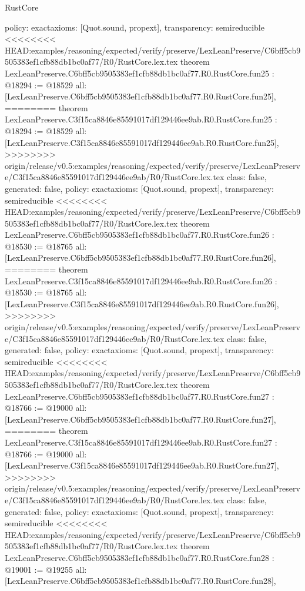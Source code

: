 \begin{lexlean}{RustCore}
\begin{coremodule}
{\begin{coremodule}
{{{{{{{{{{{{{{{{{{{{{{{{{{{{  policy: exact{axioms: [Quot.sound, propext]},
  transparency: semireducible
}
<<<<<<<< HEAD:examples/reasoning/expected/verify/preserve/LexLeanPreserve/C6bff5cb9505383ef1cfb88db1bc0af77/R0/RustCore.lex.tex
theorem LexLeanPreserve.C6bff5cb9505383ef1cfb88db1bc0af77.R0.RustCore.fun25 : @18294 := @18529 {
  all: [LexLeanPreserve.C6bff5cb9505383ef1cfb88db1bc0af77.R0.RustCore.fun25],
========
theorem LexLeanPreserve.C3f15ca8846e85591017df129446ee9ab.R0.RustCore.fun25 : @18294 := @18529 {
  all: [LexLeanPreserve.C3f15ca8846e85591017df129446ee9ab.R0.RustCore.fun25],
>>>>>>>> origin/release/v0.5:examples/reasoning/expected/verify/preserve/LexLeanPreserve/C3f15ca8846e85591017df129446ee9ab/R0/RustCore.lex.tex
  class: false,
  generated: false,
  policy: exact{axioms: [Quot.sound, propext]},
  transparency: semireducible
}
<<<<<<<< HEAD:examples/reasoning/expected/verify/preserve/LexLeanPreserve/C6bff5cb9505383ef1cfb88db1bc0af77/R0/RustCore.lex.tex
theorem LexLeanPreserve.C6bff5cb9505383ef1cfb88db1bc0af77.R0.RustCore.fun26 : @18530 := @18765 {
  all: [LexLeanPreserve.C6bff5cb9505383ef1cfb88db1bc0af77.R0.RustCore.fun26],
========
theorem LexLeanPreserve.C3f15ca8846e85591017df129446ee9ab.R0.RustCore.fun26 : @18530 := @18765 {
  all: [LexLeanPreserve.C3f15ca8846e85591017df129446ee9ab.R0.RustCore.fun26],
>>>>>>>> origin/release/v0.5:examples/reasoning/expected/verify/preserve/LexLeanPreserve/C3f15ca8846e85591017df129446ee9ab/R0/RustCore.lex.tex
  class: false,
  generated: false,
  policy: exact{axioms: [Quot.sound, propext]},
  transparency: semireducible
}
<<<<<<<< HEAD:examples/reasoning/expected/verify/preserve/LexLeanPreserve/C6bff5cb9505383ef1cfb88db1bc0af77/R0/RustCore.lex.tex
theorem LexLeanPreserve.C6bff5cb9505383ef1cfb88db1bc0af77.R0.RustCore.fun27 : @18766 := @19000 {
  all: [LexLeanPreserve.C6bff5cb9505383ef1cfb88db1bc0af77.R0.RustCore.fun27],
========
theorem LexLeanPreserve.C3f15ca8846e85591017df129446ee9ab.R0.RustCore.fun27 : @18766 := @19000 {
  all: [LexLeanPreserve.C3f15ca8846e85591017df129446ee9ab.R0.RustCore.fun27],
>>>>>>>> origin/release/v0.5:examples/reasoning/expected/verify/preserve/LexLeanPreserve/C3f15ca8846e85591017df129446ee9ab/R0/RustCore.lex.tex
  class: false,
  generated: false,
  policy: exact{axioms: [Quot.sound, propext]},
  transparency: semireducible
}
<<<<<<<< HEAD:examples/reasoning/expected/verify/preserve/LexLeanPreserve/C6bff5cb9505383ef1cfb88db1bc0af77/R0/RustCore.lex.tex
theorem LexLeanPreserve.C6bff5cb9505383ef1cfb88db1bc0af77.R0.RustCore.fun28 : @19001 := @19255 {
  all: [LexLeanPreserve.C6bff5cb9505383ef1cfb88db1bc0af77.R0.RustCore.fun28],
}}}}}}}}}}}}}}}}}}}}}}}}}}}}}}}
\end{coremodule}}
\end{coremodule}
\end{lexlean}
